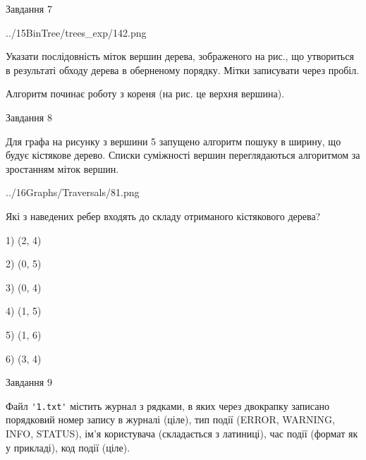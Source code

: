 \documentclass[12pt, ukrainian]{article}
\def\code#1{\Verb!#1!}
\begin{document}
{\vspace{10mm}\par

\newpage
\begin{minipage}[t]{9.7cm}
               
{\begin{center}Завдання {7}\end{center}}
\vspace{-4mm}

\begin{center}
	{../15BinTree/trees_exp/142.png}
\end{center}
Указати послідовність міток вершин дерева, зображеного на рис., що утвориться в результаті обходу дерева в оберненому порядку. Мітки записувати через пробіл.\par Алгоритм починає роботу з кореня (на рис. це верхня вершина).\par

\end{minipage}
\vline \hspace{8mm}
\begin{minipage}[t]{8.0cm}
               
{\begin{center}Завдання {8}\end{center}}
\vspace{-4mm}
Для графа на рисунку з вершини 5 запущено алгоритм пошуку в ширину, що будує кістякове дерево. Списки суміжності вершин переглядаються алгоритмом за зростанням міток вершин.\par
\begin{center}
	{../16Graphs/Traversals/81.png}
\end{center}
\par Які з наведених ребер входять до складу отриманого кістякового дерева?\par
1) (2, 4)\par
2) (0, 5)\par
3) (0, 4)\par
4) (1, 5)\par
5) (1, 6)\par
6) (3, 4)\par
{\vskip 15pt} \par

\end{minipage}

               
{\begin{center}Завдання {9}\end{center}}
\vspace{-4mm}
Файл \code{'1.txt'} містить журнал з рядками, в яких через двокрапку записано поряд\-ко\-вий номер запису в журналі (ціле), тип події (ERROR, WARNING, INFO, STATUS), ім'я користувача (складається з латиниці), час події (фор\-мат як у прикладі), код події (ціле).

}
\end{document}

